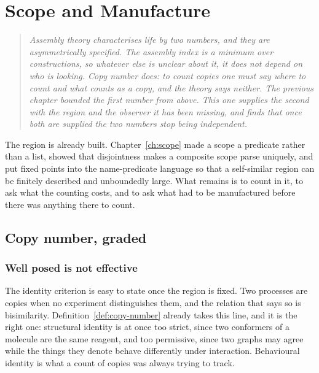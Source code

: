 \chapter{Scope and Manufacture}
\label{sec:scope-manufacture}

\begin{quote}\itshape\small
Assembly theory characterises life by two numbers, and they are
asymmetrically specified. The assembly index is a minimum over
constructions, so whatever else is unclear about it, it does not depend on
who is looking. Copy number does: to count copies one must say where to
count and what counts as a copy, and the theory says neither. The previous
chapter bounded the first number from above. This one supplies the second
with the region and the observer it has been missing, and finds that once
both are supplied the two numbers stop being independent.
\end{quote}

The region is already built. Chapter~\ref{ch:scope} made a scope a
predicate rather than a list, showed that disjointness makes a composite
scope parse uniquely, and put fixed points into the name-predicate
language so that a self-similar region can be finitely described and
unboundedly large. What remains is to count in it, to ask what the
counting costs, and to ask what had to be manufactured before there was
anything there to count.

\section{Copy number, graded}
\label{scm:sec:graded}

\subsection{Well posed is not effective}

The identity criterion is easy to state once the region is fixed. Two
processes are copies when no experiment distinguishes them, and the
relation that says so is bisimilarity. Definition~\ref{def:copy-number}
already takes this line, and it is the right one: structural identity is
at once too strict, since two conformers of a molecule are the same
reagent, and too permissive, since two graphs may agree while the things
they denote behave differently under interaction. Behavioural identity is
what a count of copies was always trying to track.

